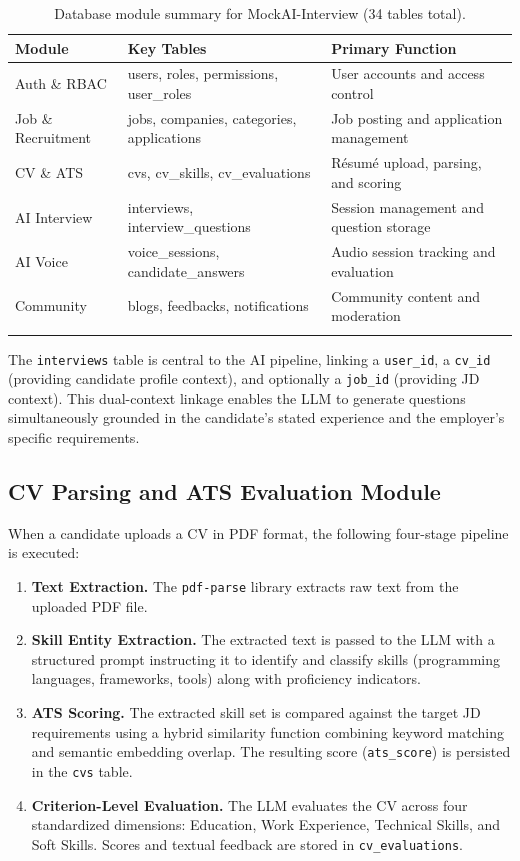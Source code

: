 \documentclass[pdflatex,sn-mathphys-num]{sn-jnl}%
\theoremstyle{thmstyleone}%
\theoremstyle{thmstyletwo}%
\theoremstyle{thmstylethree}%
\begin{document}
\begin{table}[h]
\caption{Database module summary for MockAI-Interview (34 tables total).}\label{tab:schema}%
\begin{tabular*}{\textwidth}{@{\extracolsep\fill}lll}
\toprule%
\textbf{Module} & \textbf{Key Tables} & \textbf{Primary Function} \\
\midrule
Auth \& RBAC       & users, roles, permissions, user\_roles    & User accounts and access control \\
Job \& Recruitment & jobs, companies, categories, applications & Job posting and application management \\
CV \& ATS          & cvs, cv\_skills, cv\_evaluations          & Résumé upload, parsing, and scoring \\
AI Interview       & interviews, interview\_questions           & Session management and question storage \\
AI Voice           & voice\_sessions, candidate\_answers       & Audio session tracking and evaluation \\
Community          & blogs, feedbacks, notifications           & Community content and moderation \\
\botrule
\end{tabular*}
\end{table}

The \texttt{interviews} table is central to the AI pipeline, linking a \texttt{user\_id}, a \texttt{cv\_id} (providing candidate profile context), and optionally a \texttt{job\_id} (providing JD context). This dual-context linkage enables the LLM to generate questions simultaneously grounded in the candidate's stated experience and the employer's specific requirements.

\subsection{CV Parsing and ATS Evaluation Module}\label{subsec4-3}

When a candidate uploads a CV in PDF format, the following four-stage pipeline is executed:

\begin{enumerate}
  \item \textbf{Text Extraction.} The \texttt{pdf-parse} library extracts raw text from the uploaded PDF file.
  \item \textbf{Skill Entity Extraction.} The extracted text is passed to the LLM with a structured prompt instructing it to identify and classify skills (programming languages, frameworks, tools) along with proficiency indicators.
  \item \textbf{ATS Scoring.} The extracted skill set is compared against the target JD requirements using a hybrid similarity function combining keyword matching and semantic embedding overlap. The resulting score (\texttt{ats\_score}) is persisted in the \texttt{cvs} table.
  \item \textbf{Criterion-Level Evaluation.} The LLM evaluates the CV across four standardized dimensions: Education, Work Experience, Technical Skills, and Soft Skills. Scores and textual feedback are stored in \texttt{cv\_evaluations}.
\end{enumerate}
\end{document}
